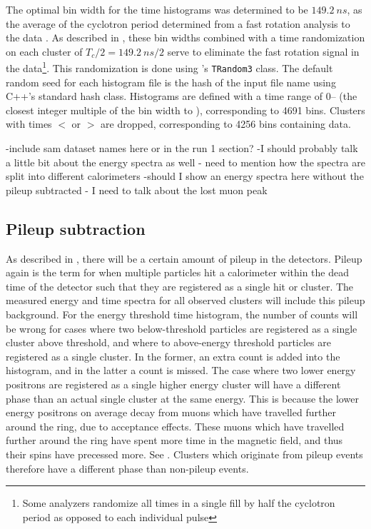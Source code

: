 The optimal bin width for the time histograms was determined to be $\SI{149.2}{ns}$, as the average of the cyclotron period determined from a fast rotation analysis to the data \cite{fastrotationsomething}. As described in , these bin widths combined with a time randomization on each cluster of $T_{c}/2 = \SI{149.2}{ns} / 2$ serve to eliminate the fast rotation signal in the data\footnote{Some analyzers randomize all times in a single fill by half the cyclotron period as opposed to each individual pulse}. This randomization is done using \ROOT's \texttt{TRandom3} class. The default random seed for each histogram \ROOT file is the hash of the input file name using C++'s standard hash class. Histograms are defined with a time range of 0-- (the closest integer multiple of the bin width to ), corresponding to 4691 bins. Clusters with times $<$  or $>$  are dropped, corresponding to 4256 bins containing data.




-include sam dataset names here or in the run 1 section?
-I should probably talk a little bit about the energy spectra as well
- need to mention how the spectra are split into different calorimeters
-should I show an energy spectra here without the pileup subtracted - I need to talk about the lost muon peak 


\subsection{Pileup subtraction}
\label{sub:pileupsubtraction}


As described in , there will be a certain amount of pileup in the detectors. Pileup again is the term for when multiple particles hit a calorimeter within the dead time of the detector such that they are registered as a single hit or cluster. The measured energy and time spectra for all observed clusters will include this pileup background. For the energy threshold time histogram, the number of counts will be wrong for cases where two below-threshold particles are registered as a single cluster above threshold, and where to above-energy threshold particles are registered as a single cluster. In the former, an extra count is added into the histogram, and in the latter a count is missed. The case where two lower energy positrons are registered as a single higher energy cluster will have a different \gmtwo phase than an actual single cluster at the same energy. This is because the lower energy positrons on average decay from muons which have travelled further around the ring, due to acceptance effects. These muons which have travelled further around the ring have spent more time in the magnetic field, and thus their spins have precessed more. See . Clusters which originate from pileup events therefore have a different \gmtwo phase than non-pileup events. 


